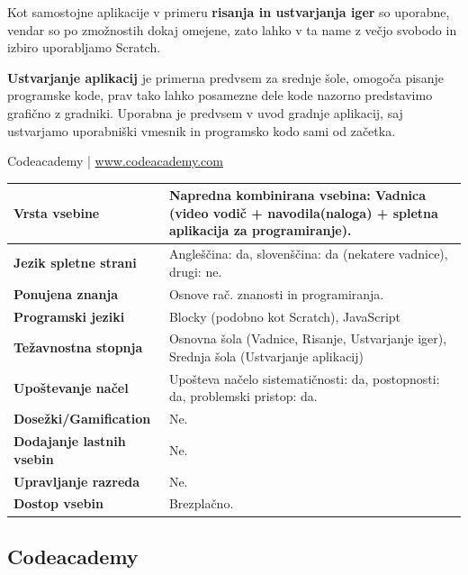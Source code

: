 Kot samostojne aplikacije v primeru \textbf{risanja in ustvarjanja
  iger} so uporabne, vendar so po zmožnostih dokaj omejene, zato lahko
v ta name z večjo svobodo in izbiro uporabljamo Scratch.

\textbf{Ustvarjanje aplikacij} je primerna predvsem za srednje šole,
omogoča pisanje programske kode, prav tako lahko posamezne dele kode
nazorno predstavimo grafično z gradniki. Uporabna je predvsem v uvod
gradnje aplikacij, saj ustvarjamo uporabniški vmesnik in programsko
kodo sami od začetka.

\begin{osebnabox}[label={osebna:codeacademy}]{Codeacademy | \url{www.codeacademy.com}}
    \begin{tabular}{
  p{} |
  p{}  }
  \textbf{Vrsta vsebine} & Napredna kombinirana vsebina: Vadnica
                           (video vodič + navodila(naloga) + spletna
                           aplikacija za programiranje). \\
      \hline 
  \textbf{Jezik spletne strani} &  Angleščina: da, slovenščina: da
                                  (nekatere vadnice),
                                  drugi: ne. \\
      \hline
  \textbf{Ponujena znanja} & Osnove rač. znanosti in programiranja. \\
      \hline
  \textbf{Programski jeziki} & Blocky (podobno kot Scratch),
                               JavaScript \\
      \hline
  \textbf{Težavnostna stopnja} & Osnovna šola (Vadnice, Risanje,
                                 Ustvarjanje iger), Srednja šola
                                 (Ustvarjanje aplikacij) \\
      \hline
  \textbf{Upoštevanje načel} & Upošteva načelo sistematičnosti: da,
      postopnosti: da, problemski pristop: da. \\
      \hline
  \textbf{Dosežki/Gamification} & Ne. \\
      \hline
  \textbf{Dodajanje lastnih vsebin} & Ne. \\
      \hline
  \textbf{Upravljanje razreda} & Ne. \\
      \hline
  \textbf{Dostop vsebin} & Brezplačno. \\
\end{tabular}
\end{osebnabox}

\subsection{Codeacademy}

